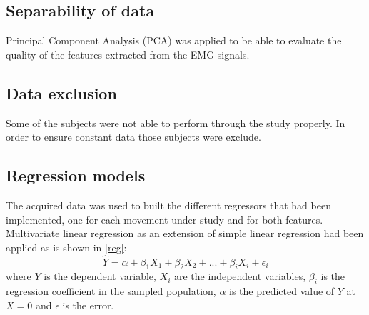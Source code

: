 	\subsection{Separability of data}
Principal Component Analysis (PCA) was applied to be able to evaluate the quality of the features extracted from the EMG signals.
	\subsection{Data exclusion}
	Some of the subjects were not able to perform through the study properly. In order to ensure constant data those subjects were exclude.
	\subsection{Regression models}
	The acquired data was used to built the different regressors that had been implemented, one for each movement under study and for both features. Multivariate linear regression as an extension of simple linear regression had been applied as is shown in \ref{reg}:
\begin{equation}
	\hat{Y} = \alpha + \beta_1 X_{1} + \beta_2 X_{2} + ... + \beta_i X_{i} + \epsilon_i
		\label{reg}
\end{equation}
	where $Y$ is the dependent variable, $X_i$ are the independent variables, $\beta_i$ is the regression coefficient in the sampled population, $\alpha$ is the predicted value of $Y$ at $X = 0$ and $\epsilon$ is the error.
	
